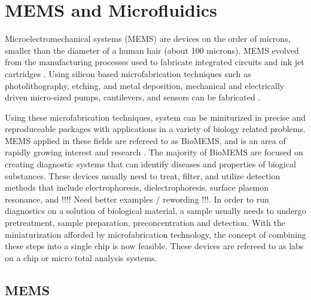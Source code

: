  
 
 \section[MEMs and Microfluidics]{MEMS and Microfluidics}
 
 \par Microelectromechanical systems (MEMS) are devices on the order of microns, smaller than the diameter of a human hair (about 100 microns). MEMS evolved from the manufacturing processes used to fabricate integrated circuits and ink jet cartridges \cite{xia_soft_1998-1}. Using silicon based microfabrication techniques such as photolithography, etching, and metal deposition, mechanical and electrically driven micro-sized pumps, cantilevers, and sensors can be fabricated \cite{wang_bio-mems:_2006}. 
 
 \par Using these microfabrication techniques, system can be miniturized in precise and reproduceable packages with applications in a variety of biology related problems. MEMS applied in these fields are refereed to as BioMEMS, and is an area of rapidly growing interest and research \cite{grayson_biomems_2004}. The majority of BioMEMS are focused on creating diagnostic systems that can identify diseases and properties of biogical substances. These devices usually need to treat, filter, and utilize detection methods that include electrophoresis, dielectrophoresis, surface plasmon resonance, and !!!! Need better examples / rewording !!!. In order to run diagnostics on a solution of biological material, a sample usually needs to undergo pretreatment, sample preparation, preconcentration and detection. With the miniaturization afforded by microfabrication technology, the concept of combining these steps into a single chip is now feasible. These devices are refereed to as labs on a chip or micro total analysis systems.
 
 \subsection{MEMS}
 
